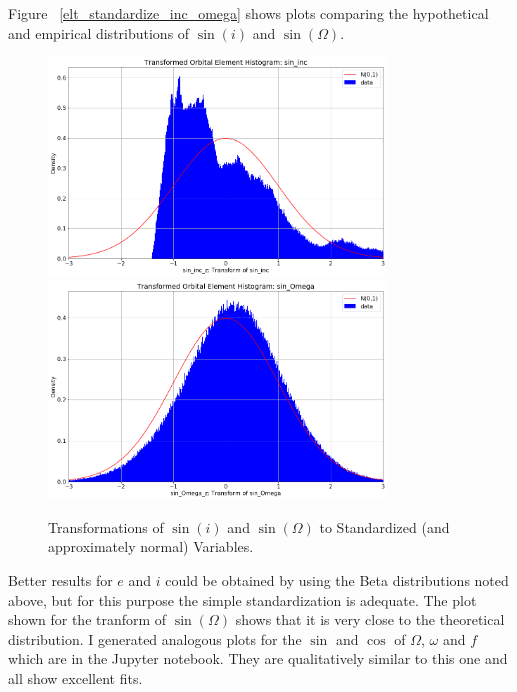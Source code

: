 Figure ~\ref{elt_standardize_inc_omega} shows plots comparing the hypothetical and empirical distributions of $\sin(i)$ and $\sin(\Omega)$.
\begin{figure}[hbt!]
\begin{center}
\includegraphics[width=0.8\textwidth]{../figs/elts_cov/sin_inc_z.png}
\includegraphics[width=0.8\textwidth]{../figs/elts_cov/sin_Omega_z.png}
\end{center}
\caption[Transformations of $\sin(i)$ and $\sin(\Omega)$ to Standardized Variables.]
{Transformations of $\sin(i)$ and $\sin(\Omega)$ to Standardized (and approximately normal) Variables.}
\label{fig:elt_standardize_inc_omega}
\end{figure}
Better results for $e$ and $i$ could be obtained by using the Beta distributions noted above, but for this purpose the simple standardization is adequate.
The plot shown for the tranform of $\sin(\Omega)$ shows that it is very close to the theoretical distribution.
I generated analogous plots for the $\sin$ and $\cos$ of $\Omega$, $\omega$ and $f$ which are in the Jupyter notebook.
They are qualitatively similar to this one and all show excellent fits.

